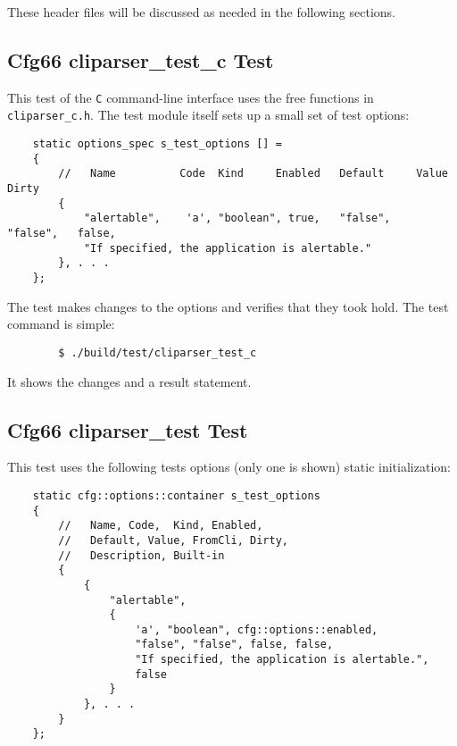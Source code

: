     These header files will be discussed as needed in the following sections.

\subsection{Cfg66 cliparser\_test\_c Test}
\label{subsec:cfg66_tests_cliparser_test_c}

    This test of the \texttt{C} command-line interface uses the free
    functions in \texttt{cliparser\_c.h}. The test module itself
    sets up a small set of test options:

    \begin{verbatim}
    static options_spec s_test_options [] =
    {
        //   Name          Code  Kind     Enabled   Default     Value      Dirty
        {
            "alertable",    'a', "boolean", true,   "false",    "false",   false,
            "If specified, the application is alertable."
        }, . . .
    };
    \end{verbatim}

    The test makes changes to the options and verifies that they
    took hold.
    The test command is simple:

    \begin{verbatim}
        $ ./build/test/cliparser_test_c
    \end{verbatim}

    It shows the changes and a result statement.

\subsection{Cfg66 cliparser\_test Test}
\label{subsec:cfg66_tests_cliparser_test}

    This test uses the following tests options (only one is shown)
    static initialization:

    \begin{verbatim}
    static cfg::options::container s_test_options
    {
        //   Name, Code,  Kind, Enabled,
        //   Default, Value, FromCli, Dirty,
        //   Description, Built-in
        {
            {
                "alertable",
                {
                    'a', "boolean", cfg::options::enabled,
                    "false", "false", false, false,
                    "If specified, the application is alertable.",
                    false
                }
            }, . . .
        }
    };
    \end{verbatim}


